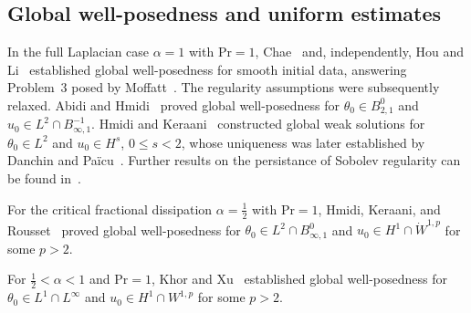 \documentclass[reqno,11pt,a4paper]{amsart}
\begin{document}
\subsection{Global well-posedness and uniform estimates}
In the full Laplacian case $\alpha=1$ with $\mathrm{Pr}=1$,
Chae~\cite{DC06} and, independently, Hou and Li~\cite{HL05}
established global well-posedness for smooth initial data,
answering Problem~3 posed by Moffatt~\cite{Moff01}.
The regularity assumptions were subsequently relaxed.
Abidi and Hmidi~\cite{AH07} proved global well-posedness for
$\theta_0\in B^0_{2,1}$ and
$u_0\in L^2\cap B^{-1}_{\infty,1}$.
Hmidi and Keraani~\cite{HK07} constructed global weak
solutions for $\theta_0\in L^2$ and $u_0\in H^s$,
$0\leq s<2$, whose uniqueness was later established
by Danchin and Pa\"icu~\cite{DP08}.
Further results on the persistance of Sobolev regularity
can be found in~\cite{HKZ15}.

For the critical fractional dissipation
$\alpha=\frac12$ with $\mathrm{Pr}=1$,
Hmidi, Keraani, and Rousset~\cite{HKR10}
proved global well-posedness for
$\theta_0\in L^2\cap B^0_{\infty,1}$ and
$u_0\in H^1\cap\dot W^{1,p}$ for some $p>2$.


For $\frac12<\alpha<1$ and $\mathrm{Pr}=1$,
Khor and Xu~\cite{KX22} established global well-posedness
for $\theta_0\in L^1\cap L^\infty$ and
$u_0\in H^1\cap W^{1,p}$ for some $p>2$.
\end{document}
